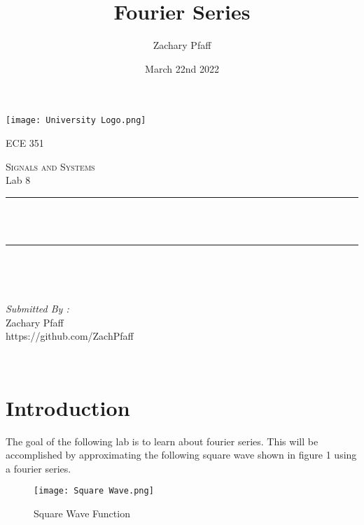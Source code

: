 \documentclass[12pt]{report}
\title{Fourier Series}
\author{Zachary Pfaff}
\date{March 22nd 2022}
\makeatletter
\let\thetitle\@title
\makeatother
\begin{document}
\begin{titlepage}
\centering
\vspace*{0.5 cm}
\texttt{[image: University Logo.png]}\\
\begin{center}    \textsc{\Large   ECE 351}\\[2.0 cm]
\end{center}%
\textsc{\Large Signals and Systems  }\\[0.5 cm] %
Lab 8
\rule{\linewidth}{0.2 mm} \\[0.4 cm]
{ \huge \bfseries \thetitle}\\
\rule{\linewidth}{0.2 mm} \\[1.5 cm]
\begin{minipage}{0.4\textwidth}
\begin{flushleft} \large
\end{flushleft}
\end{minipage}~
\begin{minipage}{0.4\textwidth}
\begin{flushright} \large
\emph{Submitted By :} \\
Zachary Pfaff\\https://github.com/ZachPfaff
\end{flushright}
\end{minipage}\\[2 cm]
\end{titlepage}
\tableofcontents
\pagebreak
\renewcommand{\thesection}{\arabic{section}}
\setlength{\parindent}{20pt}

\maketitle
\section{Introduction}
\hspace{\parindent}The goal of the following lab is to learn about fourier series. This will be accomplished by approximating the following square wave shown in figure 1 using a fourier series. 
\begin{figure}[h!]
    \centering
    \texttt{[image: Square Wave.png]}
    \caption{Square Wave Function}
    \label{Figure x:}
\end{figure}
\end{document}

